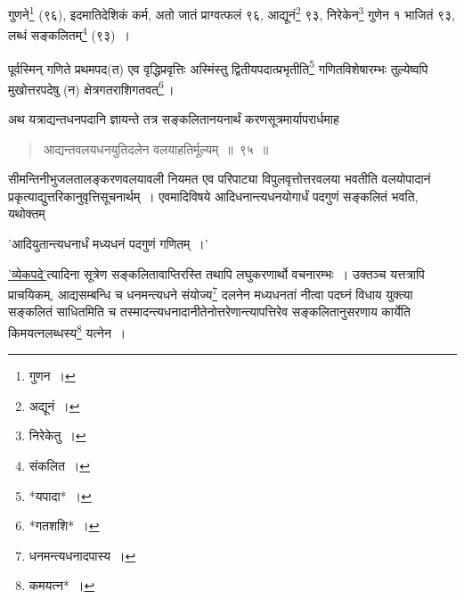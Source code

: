 \documentclass[10pt, openany]{book}
\begin{document}
{{{{{{{{{{{
{गुणने\renewcommand{\thefootnote}{१०}\footnote{गुणन~।} (९६), इदमातिदेशिकं कर्म, अतो जातं प्राग्वत्फलं ९६,
आद्यूनं\renewcommand{\thefootnote}{११}\footnote{अद्यूनं~।} ९३, निरेकेन\renewcommand{\thefootnote}{१२}\footnote{निरेकेतु~।} गुणेन १}
{भाजितं ९३, लब्धं सङ्कलितम्\renewcommand{\thefootnote}{१३}\footnote{संकलित~।} (९३)~।}
\vspace{3mm}

{पूर्वस्मिन् गणिते प्रथमपद(त) एव वृद्धिप्रवृत्तिः अस्मिंस्तु
द्वितीयपदात्प्रभृतीति\renewcommand{\thefootnote}{१४}\footnote{*यपादा*~।}}
{गणितविशेषारम्भः तुल्येष्वपि मुखोत्तरपदेषु (न) क्षेत्रगतराशिगतवत्\renewcommand{\thefootnote}{१५}\footnote{*गतशशि*~।}\,।}
\vspace{3mm}

{अथ यत्राद्यन्तधनपदानि ज्ञायन्ते तत्र सङ्कलितानयनार्थं
करणसूत्रमार्यापरार्धमाह\textemdash}

\begin{quote}
    
 {\bs आद्यन्तवलयधनयुतिदलेन वलयाहतिर्मूल्यम्~॥~९५~॥}\end{quote}

\newpage

{सीमन्तिनीभुजलतालङ्करणवलयावली नियमत एव परिपाट्या विपुलवृत्तोत्तरवलया}
{भवतीति वलयोपादानं प्रकृत्याद्युत्तरिकानुवृत्तिसूचनार्थम्~। एवमादिविषये
आदिधनान्त्यधनयोगार्धं पदगुणं सङ्कलितं भवति, यथोक्तम्\textemdash}
\vspace{-1mm}

\begin{center}
    
{\qt 'आदियुतान्त्यधनार्धं मध्यधनं पदगुणं गणितम्~।'} \end{center}
\vspace{-1mm}

{\hyperref[85]{'व्येकपदे'}त्यादिना सूत्रेण सङ्कलितावाप्तिरस्ति तथापि लघुकरणार्थो
वचनारम्भः~। उक्तञ्च}
{यत्तत्रापि प्राचयिकम्, आद्यसम्बन्धि च धनमन्त्यधने संयोज्य\renewcommand{\thefootnote}{१}\footnote{धनमन्त्यधनादपास्य~।} दलनेन
मध्यधनतां नीत्वा पदघ्नं}
{विधाय युक्त्या सङ्कलितं साधितमिति च
तस्मादन्त्यधनादानीतेनोत्तरेणान्त्यापत्तिरेव}
{सङ्कलितानुसरणाय कार्येति किमयत्नलब्धस्य\renewcommand{\thefootnote}{२}\footnote{कमयत्न*~।} यत्नेन~।} 
\vspace{3mm}

}}}}}}}}}}}
\end{document}

